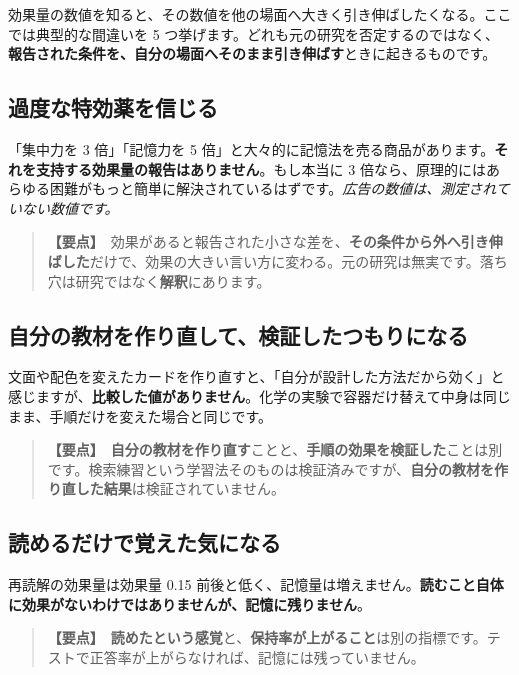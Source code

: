 \documentclass{article}
\begin{document}
効果量の数値を知ると、その数値を他の場面へ大きく引き伸ばしたくなる。ここでは典型的な間違いを 5 つ挙げます。どれも元の研究を否定するのではなく、\textbf{報告された条件を、自分の場面へそのまま引き伸ばす}ときに起きるものです。

\subsection{過度な特効薬を信じる}

「集中力を 3 倍」「記憶力を 5 倍」と大々的に記憶法を売る商品があります。\textbf{それを支持する効果量の報告はありません}。もし本当に 3 倍なら、原理的にはあらゆる困難がもっと簡単に解決されているはずです。\emph{広告の数値は、測定されていない数値です。}

\begin{quote}
\textbf{【要点】}\ 効果があると報告された小さな差を、\textbf{その条件から外へ引き伸ばした}だけで、効果の大きい言い方に変わる。元の研究は無実です。落ち穴は研究ではなく\textbf{解釈}にあります。
\end{quote}

\subsection{自分の教材を作り直して、検証したつもりになる}

文面や配色を変えたカードを作り直すと、「自分が設計した方法だから効く」と感じますが、\textbf{比較した値がありません}。化学の実験で容器だけ替えて中身は同じまま、手順だけを変えた場合と同じです。

\begin{quote}
\textbf{【要点】}\ \textbf{自分の教材を作り直す}ことと、\textbf{手順の効果を検証した}ことは別です。検索練習という学習法そのものは検証済みですが、\textbf{自分の教材を作り直した結果}は検証されていません。
\end{quote}

\subsection{読めるだけで覚えた気になる}

再読解の効果量は効果量 0.15 前後と低く、記憶量は増えません。\textbf{読むこと自体に効果がないわけではありませんが、記憶に残りません}。

\begin{quote}
\textbf{【要点】}\ \textbf{読めたという感覚}と、\textbf{保持率が上がること}は別の指標です。テストで正答率が上がらなければ、記憶には残っていません。
\end{quote}
\end{document}
